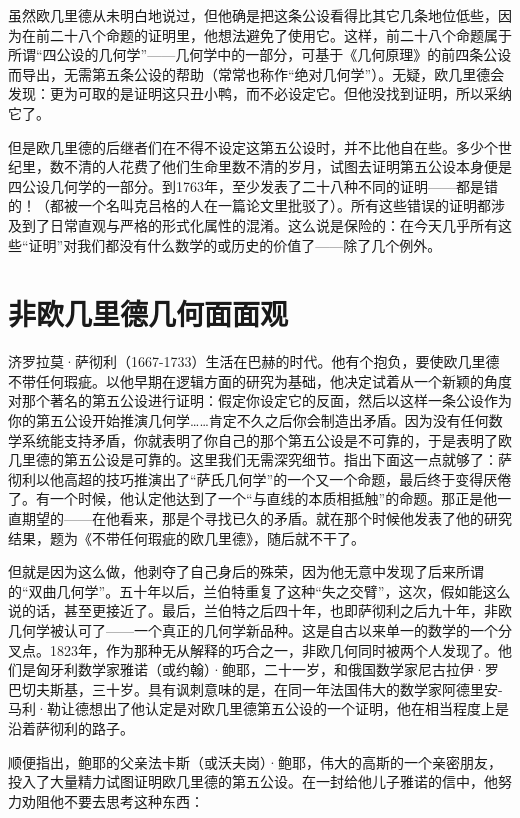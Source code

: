 虽然欧几里德从未明白地说过，但他确是把这条公设看得比其它几条地位低些，因为在前二十八个命题的证明里，他想法避免了使用它。这样，前二十八个命题属于所谓“四公设的几何学”——几何学中的一部分，可基于《几何原理》的前四条公设而导出，无需第五条公设的帮助（常常也称作“绝对几何学”）。无疑，欧几里德会发现：更为可取的是证明这只丑小鸭，而不必设定它。但他没找到证明，所以采纳它了。

但是欧几里德的后继者们在不得不设定这第五公设时，并不比他自在些。多少个世纪里，数不清的人花费了他们生命里数不清的岁月，试图去证明第五公设本身便是四公设几何学的一部分。到1763年，至少发表了二十八种不同的证明——都是错的！（都被一个名叫克吕格的人在一篇论文里批驳了）。所有这些错误的证明都涉及到了日常直观与严格的形式化属性的混淆。这么说是保险的：在今天几乎所有这些“证明”对我们都没有什么数学的或历史的价值了——除了几个例外。

\section{非欧几里德几何面面观}

济罗拉莫·萨彻利（1667-1733）生活在巴赫的时代。他有个抱负，要使欧几里德不带任何瑕疵。以他早期在逻辑方面的研究为基础，他决定试着从一个新颖的角度对那个著名的第五公设进行证明：假定你设定它的反面，然后以这样一条公设作为你的第五公设开始推演几何学……肯定不久之后你会制造出矛盾。因为没有任何数学系统能支持矛盾，你就表明了你自己的那个第五公设是不可靠的，于是表明了欧几里德的第五公设是可靠的。这里我们无需深究细节。指出下面这一点就够了：萨彻利以他高超的技巧推演出了“萨氏几何学”的一个又一个命题，最后终于变得厌倦了。有一个时候，他认定他达到了一个“与直线的本质相抵触”的命题。那正是他一直期望的——在他看来，那是个寻找已久的矛盾。就在那个时候他发表了他的研究结果，题为《不带任何瑕疵的欧几里德》，随后就不干了。

但就是因为这么做，他剥夺了自己身后的殊荣，因为他无意中发现了后来所谓的“双曲几何学”。五十年以后，兰伯特重复了这种“失之交臂”，这次，假如能这么说的话，甚至更接近了。最后，兰伯特之后四十年，也即萨彻利之后九十年，非欧几何学被认可了——一个真正的几何学新品种。这是自古以来单一的数学的一个分叉点。1823年，作为那种无从解释的巧合之一，非欧几何同时被两个人发现了。他们是匈牙利数学家雅诺（或约翰）·鲍耶，二十一岁，和俄国数学家尼古拉伊·罗巴切夫斯基，三十岁。具有讽刺意味的是，在同一年法国伟大的数学家阿德里安-马利·勒让德想出了他认定是对欧几里德第五公设的一个证明，他在相当程度上是沿着萨彻利的路子。

顺便指出，鲍耶的父亲法卡斯（或沃夫岗）·鲍耶，伟大的高斯的一个亲密朋友，投入了大量精力试图证明欧几里德的第五公设。在一封给他儿子雅诺的信中，他努力劝阻他不要去思考这种东西：


